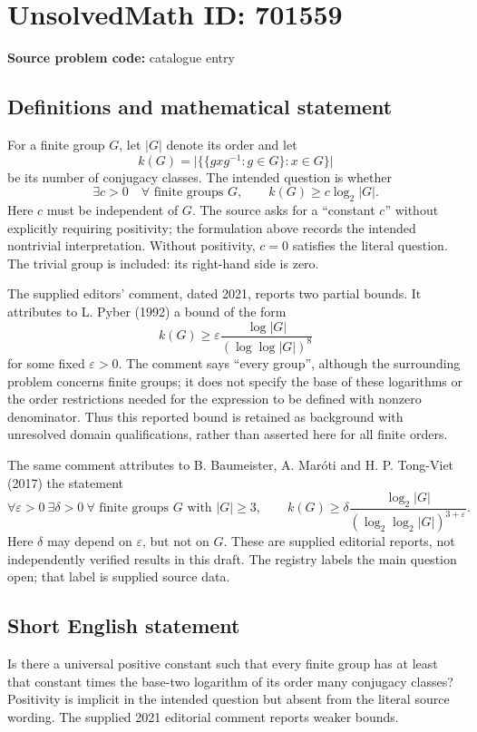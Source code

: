 \documentclass[11pt]{article}
\begin{document}
\section*{UnsolvedMath ID: 701559}
\textbf{Source problem code:} catalogue entry
\subsection{Definitions and mathematical statement}
For a finite group \(G\), let \(|G|\) denote its order and let
\[
k(G)=\bigl|\{\{gxg^{-1}:g\in G\}:x\in G\}\bigr|
\]
be its number of conjugacy classes. The intended question is whether
\[
\exists c>0\quad\forall\text{ finite groups }G,\qquad k(G)\ge c\log_2|G|.
\]
Here \(c\) must be independent of \(G\). The source asks for a ``constant \(c\)'' without explicitly requiring positivity; the formulation above records the intended nontrivial interpretation. Without positivity, \(c=0\) satisfies the literal question. The trivial group is included: its right-hand side is zero.

The supplied editors' comment, dated 2021, reports two partial bounds. It attributes to L. Pyber (1992) a bound of the form
\[
k(G)\ge \varepsilon\frac{\log|G|}{(\log\log|G|)^8}
\]
for some fixed \(\varepsilon>0\). The comment says ``every group'', although the surrounding problem concerns finite groups; it does not specify the base of these logarithms or the order restrictions needed for the expression to be defined with nonzero denominator. Thus this reported bound is retained as background with unresolved domain qualifications, rather than asserted here for all finite orders.

The same comment attributes to B. Baumeister, A. Mar\'oti and H. P. Tong-Viet (2017) the statement
\[
\forall\varepsilon>0\ \exists\delta>0\ \forall\text{ finite groups }G\text{ with }|G|\ge3,\qquad
k(G)\ge\delta\frac{\log_2|G|}{(\log_2\log_2|G|)^{3+\varepsilon}}.
\]
Here \(\delta\) may depend on \(\varepsilon\), but not on \(G\). These are supplied editorial reports, not independently verified results in this draft. The registry labels the main question open; that label is supplied source data.
\subsection{Short English statement}
Is there a universal positive constant such that every finite group has at least that constant times the base-two logarithm of its order many conjugacy classes? Positivity is implicit in the intended question but absent from the literal source wording. The supplied 2021 editorial comment reports weaker bounds.
\end{document}
